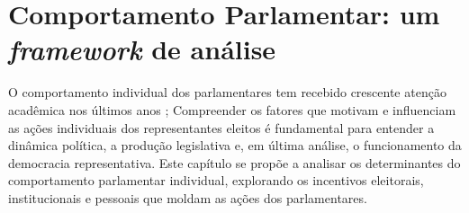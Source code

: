 \section{Comportamento Parlamentar: um \textit{framework} de análise}
\label{section:comportamento}


O comportamento individual dos parlamentares tem recebido crescente atenção acadêmica nos últimos anos \cite{brauninger2012personal, depauw2008legislative, proksch2012institutional, louwerse_personalised_2016}; Compreender os fatores que motivam e influenciam as ações individuais dos representantes eleitos é fundamental para entender a dinâmica política, a produção legislativa e, em última análise, o funcionamento da democracia representativa. Este capítulo se propõe a analisar os determinantes do comportamento parlamentar individual, explorando os incentivos eleitorais, institucionais e pessoais que moldam as ações dos parlamentares.

